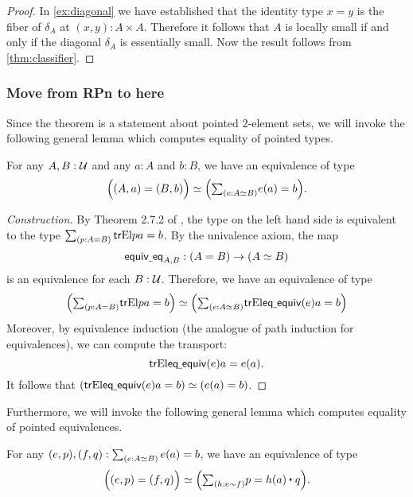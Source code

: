 \begin{proof}
In \cref{ex:diagonal} we have established that the identity type $x=y$ is the fiber of $\delta_A$ at $(x,y):A\times A$. Therefore it follows that $A$ is locally small if and only if the diagonal $\delta_A$ is essentially small.
Now the result follows from \cref{thm:classifier}.
\end{proof}

\subsubsection{Move from RPn to here}
Since the theorem is a statement about pointed $2$\nobreakdash-element sets, 
we will invoke the following general lemma which computes equality of pointed types.

\begin{lem}\label{lem:equiv_of_ptdtype}
For any $A,B:\mathcal{U}$ and any $a:A$ and $b:B$, we have an equivalence of type
\begin{equation*}
\eqv{\Big(\pairr{A,a}=\pairr{B,b}\Big)}{\Big(\sm{e:\eqv{A}{B}}e(a)=b\Big)}.
\end{equation*}
\end{lem}

\begin{proof}[Construction]
By Theorem 2.7.2 of \cite{hottbook}, the type on the left hand side is
equivalent to the type $\sm{p:A=B}\tr{\universalfam}{p}{a}=b$.
By the univalence axiom, the map 
\begin{equation*}
\equiveq_{A,B}:(A=B)\to (\eqv{A}{B})
\end{equation*}
is an equivalence for each $B:\mathcal{U}$. 
Therefore, we have an equivalence of type
\begin{equation*}
\eqv{\Big(\sm{p:A=B}\tr{\universalfam}{p}{a}=b\Big)}{\Big(\sm{e:\eqv{A}{B}}\tr{\universalfam}{\eqequiv(e)}{a}=b\Big)}
\end{equation*} 
Moreover, by equivalence induction (the analogue of path induction for 
equivalences), we can compute the transport:
\begin{equation*}
\mathsf{tr}{\mathrm{El}}{\mathsf{eq\underline{\ }{}equiv}(e)}{a}=e(a).
\end{equation*}
It follows that $\eqv{(\tr{\universalfam}{\eqequiv(e)}{a}=b)}
{(e(a)=b)}$.
\end{proof}

Furthermore, we will invoke the following general lemma which computes equality of pointed
equivalences.

\begin{lem}\label{lem:equiv_of_ptdequiv}
For any $\pairr{e,p},\pairr{f,q}:\sm{e:\eqv{A}{B}}e(a)=b$, we have an equivalence of type
\begin{equation*}
\eqv{\Big(\pairr{e,p}=\pairr{f,q}\Big)}{\Big(\sm{h:e\htpy f} p=\ct{h(a)}{q}\Big)}.
\end{equation*}
\end{lem}


